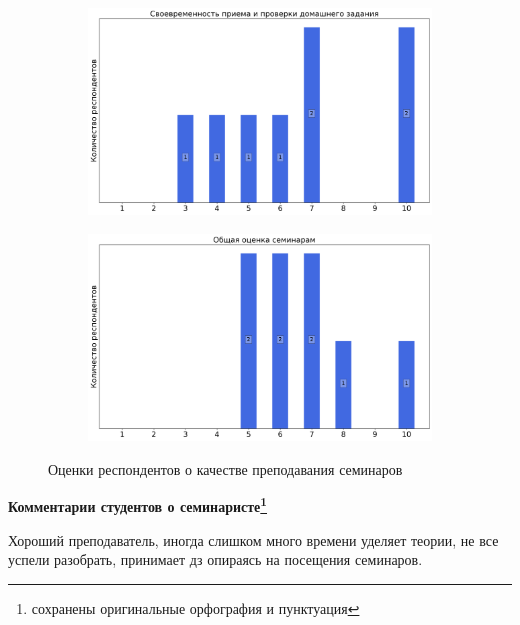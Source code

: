 \begin{figure}[H]
\begin{subfigure}[b]{0.45\textwidth}
                \end{subfigure}
                \begin{subfigure}[b]{0.45\textwidth}
                    \centering
                    \includegraphics[width=\textwidth]{images/3 course/Общая физика - квантовая физика/seminarists-marks-Покотило И.Л.-2.png}
                \end{subfigure}
                \begin{subfigure}[b]{0.45\textwidth}
                    \centering
                    \includegraphics[width=\textwidth]{images/3 course/Общая физика - квантовая физика/seminarists-marks-Покотило И.Л.-3.png}
                \end{subfigure}	
                \caption{Оценки респондентов о качестве преподавания семинаров}
            \end{figure}

            \textbf{Комментарии студентов о семинаристе\protect\footnote{сохранены оригинальные орфография и пунктуация}}
                \begin{commentbox} 
                    Хороший преподаватель, иногда слишком много времени уделяет теории, не все успели разобрать, принимает дз опираясь на посещения семинаров. 
                \end{commentbox} 
            
